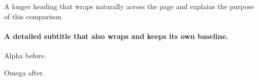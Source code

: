 \documentclass[11pt,aspectratio=43]{beamer}
\date{}
\begin{document}
\begin{frame}[plain,t]{A longer heading that wraps naturally across the page and explains the purpose of this comparison}
\framesubtitle{A detailed subtitle that also wraps and keeps its own baseline.}
Alpha before.

Omega after.
\end{frame}
\end{document}
